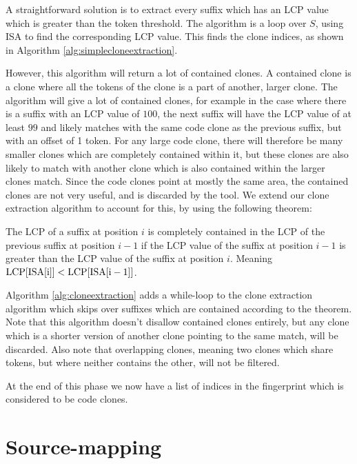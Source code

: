 A straightforward solution is to extract every suffix which has an LCP value which is
greater than the token threshold. The algorithm is a loop over $S$, using ISA to find the
corresponding LCP value. This finds the clone indices, as shown in Algorithm
\ref{alg:simplecloneextraction}.


However, this algorithm will return a lot of contained clones. A contained clone is a
clone where all the tokens of the clone is a part of another, larger clone. The algorithm
will give a lot of contained clones, for example in the case where there is a suffix with
an LCP value of $100$, the next suffix will have the LCP value of at least $99$ and likely
matches with the same code clone as the previous suffix, but with an offset of 1 token.
For any large code clone, there will therefore be many smaller clones which are completely
contained within it, but these clones are also likely to match with another clone which is
also contained within the larger clones match. Since the code clones point at mostly the
same area, the contained clones are not very useful, and is discarded by the tool. We
extend our clone extraction algorithm to account for this, by using the following theorem:

\begin{theorem} 

    The LCP of a suffix at position $i$ is completely contained in the LCP of the previous
    suffix at position $i - 1$ if the LCP value of the suffix at position $i - 1$ is
    greater than the LCP value of the suffix at position $i$. Meaning $\mathrm{LCP}[{\mathrm{ISA}[{\mathrm{i}}]}]
    < \mathrm{LCP}[{\mathrm{ISA}[{\mathrm{i} - 1}]}]$.


\end{theorem}


Algorithm \ref{alg:cloneextraction} adds a while-loop to the clone extraction algorithm
which skips over suffixes which are contained according to the theorem. Note that this
algorithm doesn't disallow contained clones entirely, but any clone which is a shorter
version of another clone pointing to the same match, will be discarded. Also note that
overlapping clones, meaning two clones which share tokens, but where neither contains the
other, will not be filtered.

At the end of this phase we now have a list of indices in the fingerprint which is
considered to be code clones.

\section{Source-mapping}


